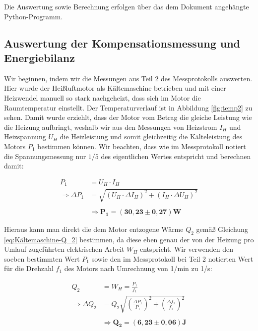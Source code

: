 \documentclass{article}
\begin{document}
Die Auswertung sowie Berechnung erfolgen über das dem Dokument angehängte Python-Programm.

\newpage

\subsection{Auswertung der Kompensationsmessung und Energiebilanz}

Wir beginnen, indem wir die Messungen aus Teil 2 des Messprotokolls auswerten. Hier wurde der Heißluftmotor als Kältemaschine betrieben und mit einer Heizwendel manuell so stark nachgeheizt, dass sich im Motor die Raumtemperatur einstellt. Der Temperaturverlauf ist in Abbildung \ref{fig:temp2} zu sehen. Damit wurde erziehlt, dass der Motor vom Betrag die gleiche Leistung wie die Heizung aufbringt, weshalb wir aus den Messungen von Heizstrom $I_H$ und Heizspannung $U_H$ die Heizleistung und somit gleichzeitig die Kälteleistung des Motors $P_1$ bestimmen können. Wir beachten, dass wie im Messprotokoll notiert die Spannungsmessung nur $1/5$ des eigentlichen Wertes entspricht und berechnen damit:

\begin{equation}
    \begin{split}
        P_1 &= U_H \cdot I_H \\
        \Rightarrow \Delta P_1 &= \sqrt{(U_H \cdot \Delta I_H)^2 + (I_H \cdot \Delta U_H)^2} \\ \\
        &\Rightarrow \bm{P_1} = \bm{(30,23 \pm 0,27)} \textbf{W}
    \end{split}
\end{equation}

Hieraus kann man direkt die dem Motor entzogene Wärme $Q_2$ gemäß Gleichung \ref{eq:Kältemaschine-Q_2} bestimmen, da diese eben genau der von der Heizung pro Umlauf zugeführten elektrischen Arbeit $W_H$ entspricht. Wir verwenden den soeben bestimmten Wert $P_1$ sowie den im Messprotokoll bei Teil 2 notierten Wert für die Drehzahl $f_1$ des Motors nach Umrechnung von 1/min zu 1/s:

\begin{equation}
    \begin{split}
        Q_2 &= W_H = \frac{P_1}{f_1} \\
        \Rightarrow \Delta Q_2 &= Q_2 \sqrt{\left( \frac{\Delta P_1}{P_1} \right)^2 + \left( \frac{\Delta f_1}{f_1} \right)^2} \\ \\
        &\Rightarrow \bm{Q_2} = \bm{(6,23 \pm 0,06)} \textbf{J}
    \end{split}
    \label{eq:3.1-Q_2}
\end{equation}
\end{document}
